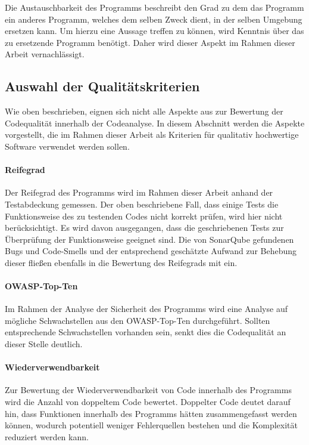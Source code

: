 \documentclass[
	oneside,  %
	ngerman, 
	final, 
	11pt, 
	a4paper, 
	1.1headlines, 
	headinclude=false, 
	footinclude=false, 
	mpinclude=false, 
	pagesize, 
	onecolumn, 
	titlepage, 
	parskip=half, 
	headsepline, 
	chapterprefix=false, 
	version=first, 
	listof=totoc, 
	bibliography=totoc, 
	toc=graduated, 
	fleqn
]{scrbook}
\begin{document}
Die Austauschbarkeit des Programms beschreibt den Grad zu dem das Programm ein anderes Programm, welches dem selben Zweck dient, in der selben Umgebung ersetzen kann.
Um hierzu eine Aussage treffen zu können, wird Kenntnis über das zu ersetzende Programm benötigt.
Daher wird dieser Aspekt im Rahmen dieser Arbeit vernachlässigt.

\subsection{Auswahl der Qualitätskriterien}
\label{Auswahl_Kriterien}
Wie oben beschrieben, eignen sich nicht alle Aspekte aus \cite{ISO-25010} zur Bewertung der Codequalität innerhalb der Codeanalyse.
In diesem Abschnitt werden die Aspekte vorgestellt, die im Rahmen dieser Arbeit als Kriterien für qualitativ hochwertige Software verwendet werden sollen.

\paragraph{Reifegrad}
Der Reifegrad des Programms wird im Rahmen dieser Arbeit anhand der Testabdeckung gemessen.
Der oben beschriebene Fall, dass einige Tests die Funktionsweise des zu testenden Codes nicht korrekt prüfen, wird hier nicht berücksichtigt.
Es wird davon ausgegangen, dass die geschriebenen Tests zur Überprüfung der Funktionsweise geeignet sind.
Die von SonarQube gefundenen Bugs und Code-Smells und der entsprechend geschätzte Aufwand zur Behebung dieser fließen ebenfalls in die Bewertung des Reifegrads mit ein.

\paragraph{\acs{OWASP}-Top-Ten}
Im Rahmen der Analyse der Sicherheit des Programms wird eine Analyse auf mögliche Schwachstellen aus den \acs{OWASP}-Top-Ten durchgeführt.
Sollten entsprechende Schwachstellen vorhanden sein, senkt dies die Codequalität an dieser Stelle deutlich.

\paragraph{Wiederverwendbarkeit}
Zur Bewertung der Wiederverwendbarkeit von Code innerhalb des Programms wird die Anzahl von doppeltem Code bewertet.
Doppelter Code deutet darauf hin, dass Funktionen innerhalb des Programms hätten zusammengefasst werden können, wodurch potentiell weniger Fehlerquellen bestehen und die Komplexität reduziert werden kann.
\end{document}
